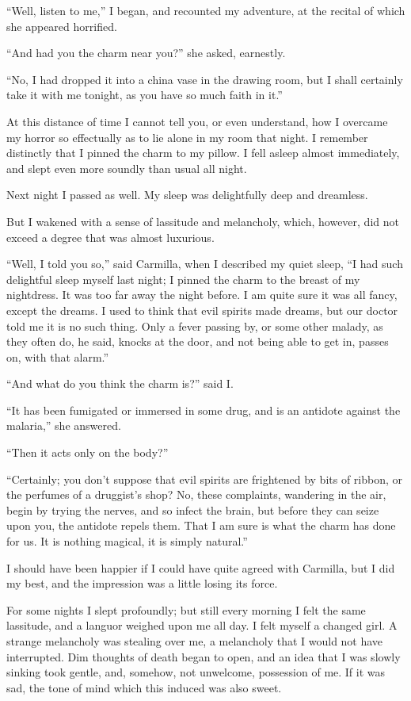 \documentclass[11pt,twoside,makeidx,hidelinks,]{memoir}
\begin{document}
``Well, listen to me,'' I began, and recounted my adventure, at the
recital of which she appeared horrified.

``And had you the charm near you?'' she asked, earnestly.

``No, I had dropped it into a china vase in the drawing room, but I shall
certainly take it with me tonight, as you have so much faith in it.''

At this distance of time I cannot tell you, or even understand, how I
overcame my horror so effectually as to lie alone in my room that night.
I remember distinctly that I pinned the charm to my pillow. I fell
asleep almost immediately, and slept even more soundly than usual
all night.

Next night I passed as well. My sleep was delightfully deep and
dreamless.

But I wakened with a sense of lassitude and melancholy, which, however,
did not exceed a degree that was almost luxurious.

``Well, I told you so,'' said Carmilla, when I described my quiet sleep,
``I had such delightful sleep myself last night; I pinned the charm to
the breast of my nightdress. It was too far away the night before. I am
quite sure it was all fancy, except the dreams. I used to think that
evil spirits made dreams, but our doctor told me it is no such thing.
Only a fever passing by, or some other malady, as they often do, he
said, knocks at the door, and not being able to get in, passes on, with
that alarm.''

``And what do you think the charm is?'' said I.

``It has been fumigated or immersed in some drug, and is an antidote
against the malaria,'' she answered.

``Then it acts only on the body?''

``Certainly; you don't suppose that evil spirits are frightened by bits
of ribbon, or the perfumes of a druggist's shop? No, these complaints,
wandering in the air, begin by trying the nerves, and so infect the
brain, but before they can seize upon you, the antidote repels them.
That I am sure is what the charm has done for us. It is nothing magical,
it is simply natural.''

I should have been happier if I could have quite agreed with Carmilla,
but I did my best, and the impression was a little losing its force.

For some nights I slept profoundly; but still every morning I felt the
same lassitude, and a languor weighed upon me all day. I felt myself a
changed girl. A strange melancholy was stealing over me, a melancholy
that I would not have interrupted. Dim thoughts of death began to open,
and an idea that I was slowly sinking took gentle, and, somehow, not
unwelcome, possession of me. If it was sad, the tone of mind which this
induced was also sweet.
\end{document}

